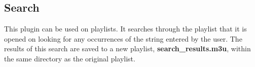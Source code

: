 \subsection{Search}
This plugin can be used on playlists.  It searches through the playlist
that it is opened on looking for any occurrences of the string entered by the
user.  The results of this search are saved to a new playlist,
\textbf{search\_results.m3u}, within the same directory as the
original playlist.

